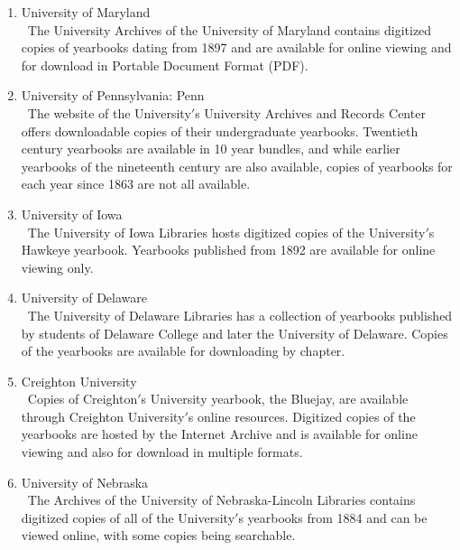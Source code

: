 \documentclass[journal]{./IEEE/IEEEtran}
\begin{document}
\begin{enumerate}
	\item University of Maryland \\
	\textendash \, The University Archives of the University of Maryland contains digitized copies of yearbooks dating from 1897 and are available for online viewing and for download in Portable Document Format (PDF). \cite{UM}\\

	\item University of Pennsylvania: Penn \\
	\textendash \, The website of the University$'$s University Archives and Records Center offers downloadable copies of their undergraduate yearbooks. Twentieth century yearbooks are available in 10 year bundles, and while earlier yearbooks of the nineteenth century are also available, copies of yearbooks for each year since 1863 are not all available. \cite{UP}\\

	\item University of Iowa \\
	\textendash \, The University of Iowa Libraries hosts digitized copies of the University$'$s Hawkeye yearbook. Yearbooks published from 1892 are available for online viewing only. \cite{UI}\\

	\item University of Delaware \\
	\textendash \, The University of Delaware Libraries has a collection of yearbooks published by students of Delaware College and later the University of Delaware. Copies of the yearbooks are available for downloading by chapter. \cite{UD}\\

	\item Creighton University \\
	\textendash \, Copies of Creighton$'$s University yearbook, the Bluejay, are available through Creighton University$'$s online resources. Digitized copies of the yearbooks are hosted by the Internet Archive and is available for online viewing and also for download in multiple formats. \cite{CU}\\

	\item University of Nebraska \\
	\textendash \, The Archives of the University of Nebraska-Lincoln Libraries contains digitized copies of all of the University$'$s yearbooks from 1884 and can be viewed online, with some copies being searchable. \cite{UN}\\
	\end{enumerate}
\end{document}
